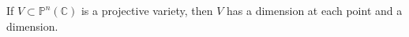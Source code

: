 If $V \subset \mathbb{P}^n(\mathbb{C})$ is a projective variety, then $V$ has a dimension at each point and a dimension.
